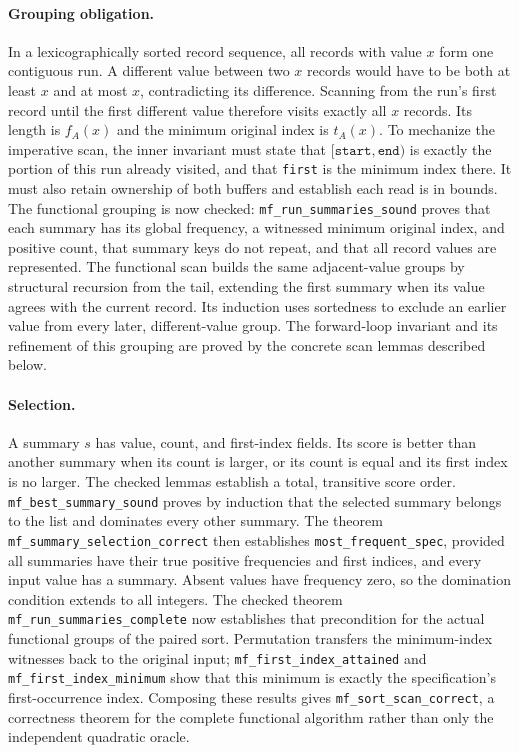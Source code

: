 \paragraph{Grouping obligation.}
In a lexicographically sorted record sequence, all records with value $x$
form one contiguous run. A different value between two $x$ records would
have to be both at least $x$ and at most $x$, contradicting its difference.
Scanning from the run's first record until the first different value
therefore visits exactly all $x$ records. Its length is $f_A(x)$ and the
minimum original index is $t_A(x)$. To mechanize the imperative scan, the
inner invariant must state that $[\texttt{start},\texttt{end})$ is exactly
the portion of this run already visited, and that \texttt{first} is the
minimum index there. It must also retain ownership of both buffers and
establish each read is in bounds. The functional grouping is now checked: \texttt{mf\_run\_summaries\_sound} proves that each summary has its global
frequency, a witnessed minimum original index, and positive count, that
summary keys do not repeat, and that all record values are represented.
The functional scan builds the same adjacent-value groups by structural
recursion from the tail, extending the first summary when its value agrees
with the current record. Its induction uses sortedness to exclude an
earlier value from every later, different-value group. The forward-loop invariant and its refinement of this grouping are proved
by the concrete scan lemmas described below.

\paragraph{Selection.}
A summary $s$ has value, count, and first-index fields. Its score is better
than another summary when its count is larger, or its count is equal and
its first index is no larger. The checked lemmas establish a total,
transitive score order. \texttt{mf\_best\_summary\_sound} proves by
induction that the selected summary belongs to the list and dominates
every other summary. The theorem \texttt{mf\_summary\_selection\_correct}
then establishes \texttt{most\_frequent\_spec}, provided all summaries
have their true positive frequencies and first indices, and every input
value has a summary. Absent values have frequency zero, so the domination
condition extends to all integers. The checked theorem \texttt{mf\_run\_summaries\_complete} now establishes
that precondition for the actual functional groups of the paired sort.
Permutation transfers the minimum-index witnesses back to the original
input; \texttt{mf\_first\_index\_attained} and
\texttt{mf\_first\_index\_minimum} show that this minimum is exactly the
specification's first-occurrence index. Composing these results gives
\texttt{mf\_sort\_scan\_correct}, a correctness theorem for the complete
functional algorithm rather than only the independent quadratic oracle.

